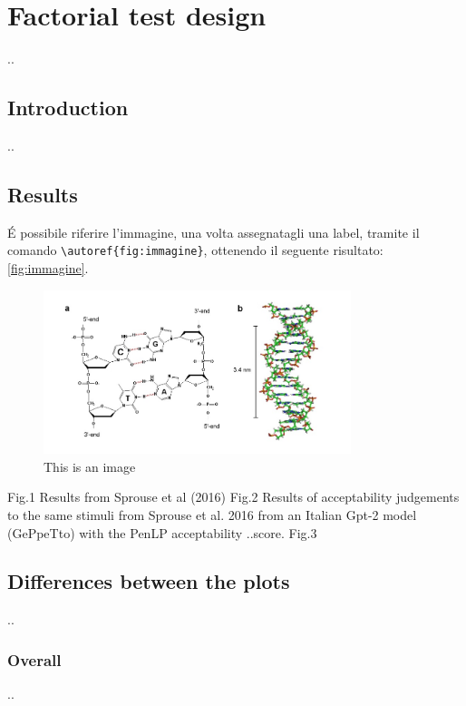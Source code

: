 \section{Factorial test design}

..

\subsection{Introduction}

..

\subsection{Results}


É possibile riferire l'immagine, una volta assegnatagli una label, tramite il comando \texttt{\textbackslash autoref\{fig:immagine\}}, ottenendo il seguente risultato: \autoref{fig:immagine}.

\begin{figure}
	\centering
	\includegraphics[width=0.8\textwidth]{images/Chapter1/immagine.jpg} %
	\caption{This is an image} 
	\label{fig:immagine} %
\end{figure}

Fig.1 Results from Sprouse et al (2016)
Fig.2 Results of acceptability judgements to the same stimuli from Sprouse et al. 2016 from an Italian Gpt-2 model (GePpeTto) with the PenLP acceptability ..score. 
Fig.3

\subsection{Differences between the plots}

..
\subsubsection{Overall}
..
